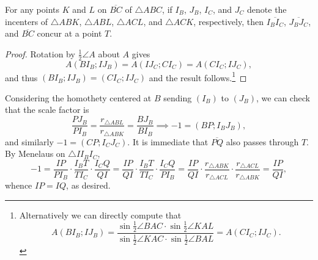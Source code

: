 \begin{lemma*}
    For any points $K$ and $L$ on $\overline{BC}$ of $\triangle ABC$, if $I_B$, $J_B$, $I_C$, and $J_C$ denote the incenters of $\triangle ABK$, $\triangle ABL$, $\triangle ACL$, and $\triangle ACK$, respectively, then $\overline{I_BI_C}$, $\overline{J_BJ_C}$, and $\overline{BC}$ concur at a point $T$.
\end{lemma*}
\begin{proof}
    Rotation by $\tfrac12\angle A$ about $A$ gives \[A(BI_B;IJ_B)=A(IJ_C;CI_C)=A(CI_C;IJ_C),\]
    and thus $(BI_B;IJ_B)=(CI_C;IJ_C)$ and the result follows.\footnote{Alternatively we can directly compute that \[A(BI_B;IJ_B)=\frac{\sin\tfrac12\angle BAC\cdot\sin\tfrac12\angle KAL}{\sin\tfrac12\angle KAC\cdot\sin\tfrac12\angle BAL}=A(CI_C;IJ_C).\]}
\end{proof}

Considering the homothety centered at $B$ sending $(I_B)$ to $(J_B)$, we can check that the scale factor is \[\frac{PJ_B}{PI_B}=\frac{r_{\triangle ABL}}{r_{\triangle ABK}}=\frac{BJ_B}{BI_B}\implies -1=(BP;I_BJ_B),\]
and similarly $-1=(CP;I_CJ_C)$. It is immediate that $\overline{PQ}$ also passes through $T$. By Menelaus on $\triangle II_BI_C$, \[-1=\frac{IP}{PI_B}\cdot\frac{I_BT}{TI_C}\cdot\frac{I_CQ}{QI}=\frac{IP}{QI}\cdot\frac{I_BT}{TI_C}\cdot\frac{I_CQ}{PI_B}=\frac{IP}{QI}\cdot\frac{r_{\triangle ABK}}{r_{\triangle ACL}}\cdot\frac{r_{\triangle ACL}}{r_{\triangle ABK}}=\frac{IP}{QI},\]
whence $IP=IQ$, as desired.

